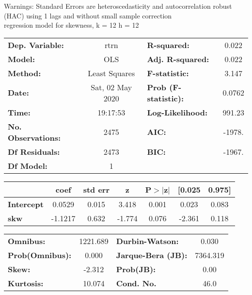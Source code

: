 Warnings: \newline
 [1] Standard Errors are heteroscedasticity and autocorrelation robust (HAC) using 1 lags and without small sample correction\\ 

regression model for skewness, k = 12 h = 12\begin{center}
\begin{tabular}{lclc}
\toprule
\textbf{Dep. Variable:}    &       rtrn       & \textbf{  R-squared:         } &     0.022   \\
\textbf{Model:}            &       OLS        & \textbf{  Adj. R-squared:    } &     0.022   \\
\textbf{Method:}           &  Least Squares   & \textbf{  F-statistic:       } &     3.147   \\
\textbf{Date:}             & Sat, 02 May 2020 & \textbf{  Prob (F-statistic):} &   0.0762    \\
\textbf{Time:}             &     19:17:53     & \textbf{  Log-Likelihood:    } &    991.23   \\
\textbf{No. Observations:} &        2475      & \textbf{  AIC:               } &    -1978.   \\
\textbf{Df Residuals:}     &        2473      & \textbf{  BIC:               } &    -1967.   \\
\textbf{Df Model:}         &           1      & \textbf{                     } &             \\
\bottomrule
\end{tabular}
\begin{tabular}{lcccccc}
                   & \textbf{coef} & \textbf{std err} & \textbf{z} & \textbf{P$> |$z$|$} & \textbf{[0.025} & \textbf{0.975]}  \\
\midrule
\textbf{Intercept} &       0.0529  &        0.015     &     3.418  &         0.001        &        0.023    &        0.083     \\
\textbf{skw}       &      -1.1217  &        0.632     &    -1.774  &         0.076        &       -2.361    &        0.118     \\
\bottomrule
\end{tabular}
\begin{tabular}{lclc}
\textbf{Omnibus:}       & 1221.689 & \textbf{  Durbin-Watson:     } &    0.030  \\
\textbf{Prob(Omnibus):} &   0.000  & \textbf{  Jarque-Bera (JB):  } & 7364.319  \\
\textbf{Skew:}          &  -2.312  & \textbf{  Prob(JB):          } &     0.00  \\
\textbf{Kurtosis:}      &  10.074  & \textbf{  Cond. No.          } &     46.0  \\
\bottomrule
\end{tabular}
\end{center}

